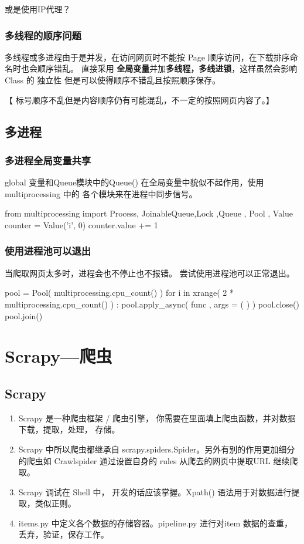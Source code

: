 \documentclass{article}
\begin{document}
      或是使用IP代理？

       \subsubsection{多线程的顺序问题}
        多线程或多进程由于是并发，在访问网页时不能按 Page 顺序访问，在下载排序命名时也会顺序错乱。 直接采用 \textbf{全局变量}并加\textbf{多线程，多线进锁}，这样虽然会影响 Class 的 独立性 但是可以使得顺序不错乱且按照顺序保存。

       【 标号顺序不乱但是内容顺序仍有可能混乱，不一定的按照网页内容了。】

     \subsection{多进程 }
          \subsubsection{多进程全局变量共享}
              global 变量和Queue模块中的Queue() 在全局变量中貌似不起作用，使用 multiprocessing 中的 各个模块来在进程中同步信号。
                \begin{python}
from multiprocessing import Process, JoinableQueue,Lock ,Queue , Pool , Value
counter = Value('i', 0)
counter.value += 1  
                \end{python}

            \subsubsection{使用进程池可以退出}
                当爬取网页太多时，进程会也不停止也不报错。 尝试使用进程池可以正常退出。
                \begin{python}
pool  = Pool( multiprocessing.cpu_count() )
for i in xrange( 2 * multiprocessing.cpu_count() ) :
        pool.apply_async( func , args = ( ) )
pool.close()  
pool.join() 
                \end{python}


    \section*{\Large Scrapy---爬虫}
    \subsection{Scrapy}
      \begin{enumerate}
            \item Scrapy 是一种爬虫框架 / 爬虫引擎， 你需要在里面填上爬虫函数，并对数据下载，提取，处理， 存储。
            \item Scrapy 中所以爬虫都继承自  scrapy.spiders.Spider。另外有别的作用更加细分的爬虫如 Crawlspider 通过设置自身的 rules 从爬去的网页中提取URL 继续爬取。
            \item Scrapy 调试在 Shell 中， 开发的话应该掌握。Xpath() 语法用于对数据进行提取，类似正则。
            \item items.py 中定义各个数据的存储容器。pipeline.py 进行对item 数据的查重，丢弃，验证，保存工作。
      \end{enumerate}
\end{document}
